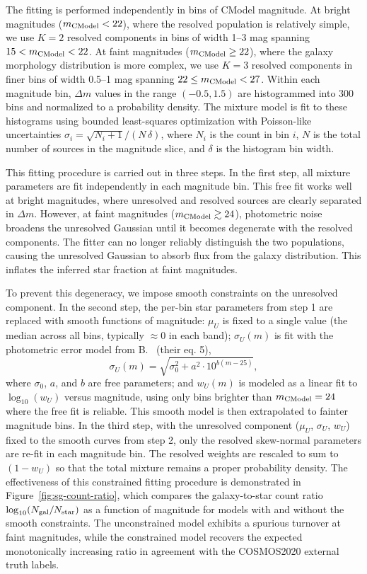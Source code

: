 The fitting is performed independently in bins of CModel magnitude. At bright magnitudes ($m_{\rm CModel}<22$), where the resolved population is relatively simple, we use $K=2$ resolved components in bins of width 1--3 mag spanning $15<m_{\rm CModel}<22$. At faint magnitudes ($m_{\rm CModel}\geq22$), where the galaxy morphology distribution is more complex, we use $K=3$ resolved components in finer bins of width 0.5--1 mag spanning $22\leq m_{\rm CModel}<27$. Within each magnitude bin, $\Delta m$ values in the range $(-0.5,1.5)$ are histogrammed into 300 bins and normalized to a probability density. The mixture model is fit to these histograms using bounded least-squares optimization with Poisson-like uncertainties $\sigma_i=\sqrt{N_i+1}/(N\,\delta)$, where $N_i$ is the count in bin $i$, $N$ is the total number of sources in the magnitude slice, and $\delta$ is the histogram bin width.

This fitting procedure is carried out in three steps. In the first step, all mixture parameters are fit independently in each magnitude bin. This free fit works well at bright magnitudes, where unresolved and resolved sources are clearly separated in $\Delta m$. However, at faint magnitudes ($m_{\rm CModel}\gtrsim24$), photometric noise broadens the unresolved Gaussian until it becomes degenerate with the resolved components. The fitter can no longer reliably distinguish the two populations, causing the unresolved Gaussian to absorb flux from the galaxy distribution. This inflates the inferred star fraction at faint magnitudes.

To prevent this degeneracy, we impose smooth constraints on the unresolved component. In the second step, the per-bin star parameters from step 1 are replaced with smooth functions of magnitude: $\mu_U$ is fixed to a single value (the median across all bins, typically $\approx0$ in each band); $\sigma_U(m)$ is fit with the photometric error model from B.~\citet{Sesar2007} (their eq. 5),
\begin{equation}
    \sigma_U(m)=\sqrt{\sigma_0^2+a^2\cdot10^{b(m-25)}},
    \label{eq:unresolved-width}
\end{equation}
where $\sigma_0$, $a$, and $b$ are free parameters; and $w_U(m)$ is modeled as a linear fit to $\log_{10}(w_U)$ versus magnitude, using only bins brighter than $m_{\rm CModel}=24$ where the free fit is reliable. This smooth model is then extrapolated to fainter magnitude bins. In the third step, with the unresolved component ($\mu_U$, $\sigma_U$, $w_U$) fixed to the smooth curves from step 2, only the resolved skew-normal parameters are re-fit in each magnitude bin. The resolved weights are rescaled to sum to $(1-w_U)$ so that the total mixture remains a proper probability density. The effectiveness of this constrained fitting procedure is demonstrated in Figure~\ref{fig:sg-count-ratio}, which compares the galaxy-to-star count ratio $\log_{10}(N_{\rm gal}/N_{\rm star})$ as a function of magnitude for models with and without the smooth constraints. The unconstrained model exhibits a spurious turnover at faint magnitudes, while the constrained model recovers the expected monotonically increasing ratio in agreement with the COSMOS2020 external truth labels.

